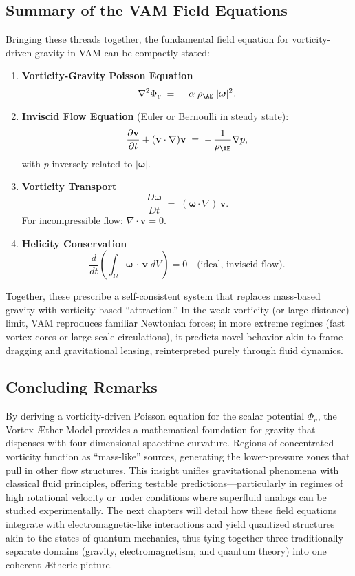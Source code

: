 \documentclass[aps,preprint,superscriptaddress]{revtex4-2}
\begin{document}
    \subsection{Summary of the VAM Field Equations}

    Bringing these threads together, the fundamental field equation for vorticity-driven gravity in VAM can be compactly stated:

    \begin{enumerate}
        \item \textbf{Vorticity-Gravity Poisson Equation}
    \[
        \nabla^2 \Phi_v \;=\; -\,\alpha\;\rho_{\mathrm{\AE}}\;\lvert \boldsymbol{\omega} \rvert^2.
    \]

        \item \textbf{Inviscid Flow Equation} (Euler or Bernoulli in steady state):
    \[
        \frac{\partial \mathbf{v}}{\partial t} + (\mathbf{v}\cdot\nabla)\mathbf{v} \;=\; -\,\frac{1}{\rho_{\mathrm{\AE}}}\nabla p,
    \]
    with \(p\) inversely related to \(\lvert \boldsymbol{\omega} \rvert\).

        \item \textbf{Vorticity Transport}
    \[
        \frac{D \boldsymbol{\omega}}{Dt} \;=\;  (\boldsymbol{\omega} \cdot \nabla)\,\mathbf{v}.
    \]
    For incompressible flow: \(\nabla \cdot \mathbf{v} = 0\).

        \item \textbf{Helicity Conservation}
    \[
        \frac{d}{dt}  \left( \int_{\Omega} \boldsymbol{\omega}\,\cdot\,\mathbf{v}\; dV \right) = 0  \quad \text{(ideal, inviscid flow)}.
    \]
    \end{enumerate}

    Together, these prescribe a self-consistent system that replaces mass-based gravity with vorticity-based “attraction.” In the weak-vorticity (or large-distance) limit, VAM reproduces familiar Newtonian forces; in more extreme regimes (fast vortex cores or large-scale circulations), it predicts novel behavior akin to frame-dragging and gravitational lensing, reinterpreted purely through fluid dynamics.

    \subsection{Concluding Remarks}

    By deriving a vorticity-driven Poisson equation for the scalar potential \(\Phi_v\), the Vortex Æther Model provides a mathematical foundation for gravity that dispenses with four-dimensional spacetime curvature. Regions of concentrated vorticity function as “mass-like” sources, generating the lower-pressure zones that pull in other flow structures. This insight unifies gravitational phenomena with classical fluid principles, offering testable predictions—particularly in regimes of high rotational velocity or under conditions where superfluid analogs can be studied experimentally. The next chapters will detail how these field equations integrate with electromagnetic-like interactions and yield quantized structures akin to the states of quantum mechanics, thus tying together three traditionally separate domains (gravity, electromagnetism, and quantum theory) into one coherent Ætheric picture.
\end{document}
